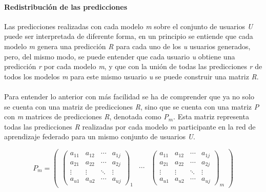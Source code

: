 \paragraph{Redistribución de las predicciones}
Las predicciones realizadas con cada modelo \textit{m} sobre el conjunto de usuarios \textit{U} puede ser interpretada de diferente forma, en un principio se entiende que cada modelo \textit{m} genera una predicción \textit{R} para cada uno de los \textit{u} usuarios generados, pero, del mismo modo, se puede entender que cada usuario \textit{u} obtiene una predicción \textit{r} por cada modelo \textit{m}, y que con la unión de todas las predicciones \textit{r} de todos los modelos \textit{m} para este mismo usuario \textit{u} se puede construir una matriz \textit{R}. 
\\ \\
Para entender lo anterior con más facilidad se ha de comprender que ya no solo se cuenta con una matriz de predicciones \textit{R}, sino que se cuenta con una matriz \textit{P} con \textit{m} matrices de predicciones \textit{R}, denotada como \textit{P$_{m}$}. Esta matriz representa todas las predicciones \textit{R} realizadas por cada modelo \textit{m} participante en la red de aprendizaje federado para un mismo conjunto de usuarios \textit{U}.
\begin{center}
    \[  \textit{P$_{m}$}=
        \begin{pmatrix}
            \begin{pmatrix}
                a_{11}  &  a_{12}  &  \cdots   & a_{1j} \\ 
                a_{21}  &  a_{22}  &  \cdots   & a_{2j}\\ 
                \vdots  &  \vdots  &  \ddots & \vdots  \\ 
                a_{u1}  &  a_{u2}  &  \cdots   & a_{uj}
            \end{pmatrix}_{\textit{1}}
            & 
            \cdots 
            &
            \begin{pmatrix}
                a_{11}  &  a_{12}  &  \cdots   & a_{1j} \\ 
                a_{21}  &  a_{22}  &  \cdots   & a_{2j}\\ 
                \vdots  &  \vdots  &  \ddots & \vdots  \\ 
                a_{u1}  &  a_{u2}  &  \cdots   & a_{uj}
            \end{pmatrix}_{\textit{m}}
        \end{pmatrix}
    \]
\end{center}
